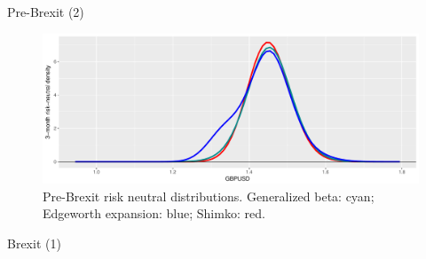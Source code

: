 \begin{frame}{Pre-Brexit (2)}

\begin{figure}
\includegraphics[width=1\linewidth]{2018_02_07_IMF_FXCourse_files/figure-beamer/unnamed-chunk-78-1} \caption{Pre-Brexit risk neutral distributions. Generalized beta: cyan; Edgeworth expansion: blue; Shimko: red.}\label{fig:unnamed-chunk-78}
\end{figure}

\end{frame}

\begin{frame}[fragile]{Brexit (1)}

\begin{Shaded}
\begin{Highlighting}[]
\NormalTok{(}\NormalTok{(}\OperatorTok{+}\StringTok{ }
\StringTok{  }\NormalTok{(}\NormalTok{(}\NormalTok{, }\NormalTok{) }\OperatorTok{+}
\StringTok{  }\NormalTok{(}\NormalTok{(}
            \NormalTok{, }\NormalTok{) }\OperatorTok{+}
\StringTok{  }\NormalTok{(}\NormalTok{(}
            \NormalTok{, }\NormalTok{) }\OperatorTok{+}
\StringTok{  }\NormalTok{(}\NormalTok{, }\NormalTok{, }\NormalTok{) }\OperatorTok{+}
\StringTok{  }\NormalTok{(}\NormalTok{, }\NormalTok{) }
\end{Highlighting}
\end{Shaded}

\end{frame}

